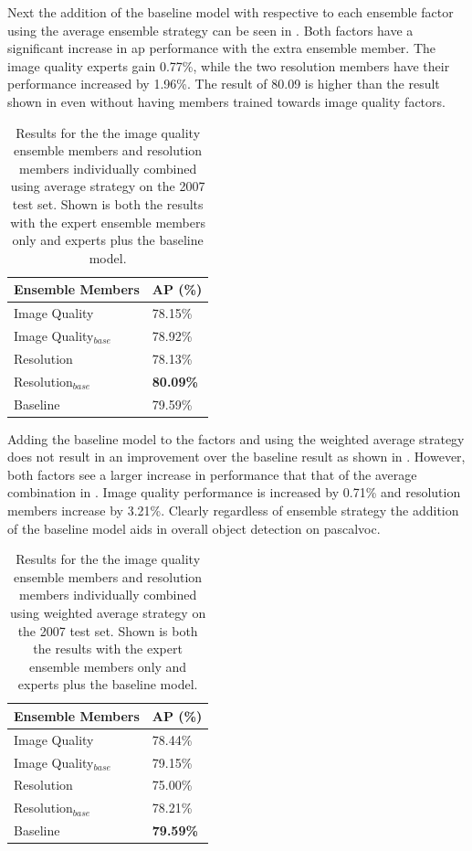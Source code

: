 Next the addition of the baseline model with respective to each ensemble factor using the average ensemble strategy can be seen in . Both factors have a significant increase in \gls{ap} performance with the extra ensemble member. The image quality experts gain 0.77\%, while the two resolution members have their performance increased by 1.96\%. The result of 80.09 is higher than the result shown in  even without having members trained towards image quality factors.

\begin{table}[h]
\centering
\caption{Results for the the image quality ensemble members and resolution members individually combined using average strategy on the 2007 test set. Shown is both the results with the expert ensemble members only and experts plus the baseline model.}
\label{tab:ensembleavg_base}
\begin{tabular}{|l|l|}
\hline
\textbf{Ensemble Members}        & \textbf{AP (\%)} \\ \hline
Image Quality & 78.15\% \\ \hline
Image Quality$_{base}$ & 78.92\% \\ \hline
Resolution    & 78.13\% \\ \hline
Resolution$_{base}$    & \textbf{80.09\%} \\ \hline
Baseline         & 79.59\% \\ \hline
\end{tabular}
\end{table}

Adding the baseline model to the factors and using the weighted average strategy does not result in an improvement over the baseline result as shown in . However, both factors see a larger increase in performance that that of the average combination in . Image quality performance is increased by 0.71\% and resolution members increase by 3.21\%. Clearly regardless of ensemble strategy the addition of the baseline model aids in overall object detection on \gls{pascalvoc}.

\begin{table}[h]
\centering
\caption{Results for the the image quality ensemble members and resolution members individually combined using weighted average strategy on the 2007 test set.  Shown is both the results with the expert ensemble members only and experts plus the baseline model.}
\label{tab:ensemblewavg_base}
\begin{tabular}{|l|l|}
\hline
\textbf{Ensemble Members}        & \textbf{AP (\%)} \\ \hline
Image Quality & 78.44\% \\ \hline
Image Quality$_{base}$ & 79.15\% \\ \hline
Resolution    & 75.00\% \\ \hline
Resolution$_{base}$    & 78.21\% \\ \hline
Baseline         & \textbf{79.59\%} \\ \hline
\end{tabular}
\end{table}

